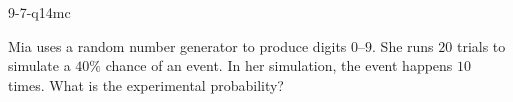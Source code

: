\begin{practiceQuestion}{9-7-q14}{mc}
\begin{questionText}
Mia uses a random number generator to produce digits $0$--$9$. She runs $20$ trials to simulate a $40\%$ chance of an event. In her simulation, the event happens $10$ times. What is the experimental probability?
\end{questionText}
\end{practiceQuestion}
